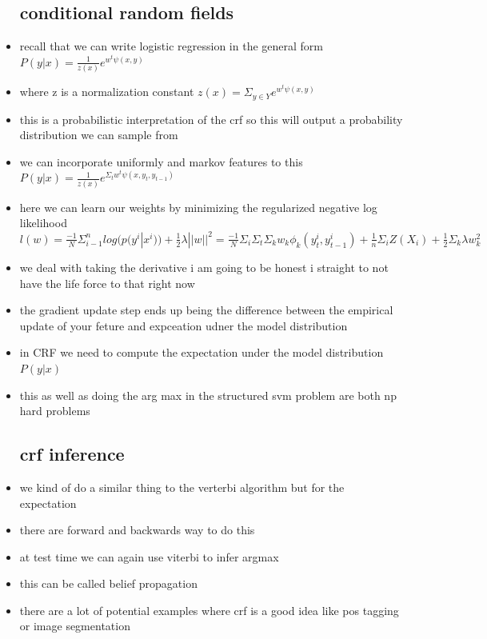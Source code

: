 \documentclass{article}
\begin{document}
\begin{itemize}
\subsection*{conditional random fields}
\item recall that we can write logistic regression in the general form $P(y|x)=\frac{1}{z(x)}e^{w^t\psi(x,y)}$
\item where z is a normalization constant $z(x)=\Sigma_{y\in Y}e^{w^t\psi(x,y)}$
\item this is a probabilistic interpretation of the crf so this will output a probability distribution we can sample from 
\item we can incorporate uniformly and markov features to this  $P(y|x)=\frac{1}{z(x)}e^{\Sigma_{t}w^t\psi(x,y_{t}, y_{t-1})}$
\item here we can learn our weights by minimizing the regularized negative log likelihood $l(w)=\frac{-1}{N}\Sigma_{i-1}^{n}log(p(y^{i}|x^{i}))+\frac{1}{2}\lambda||w||^2=\frac{-1}{N}\Sigma_{i}\Sigma_{t}\Sigma_{k}w_k\phi_{k}(y^i_t, y^i_{t-1})+\frac{1}{n}\Sigma_{i}Z(X_i)+\frac{1}{2}\Sigma_{k}\lambda w_k^2$
\item we deal with taking the derivative i am going to be honest i straight to not have the life force to that right now 
\item the gradient update step ends up being the difference between the empirical update of your feture and expceation udner the model distribution
\item in CRF we need to compute the expectation under the model distribution $P(y|x)$
\item this as well as doing the arg max in the structured svm problem are both np hard problems
\subsection*{crf inference}
\item we kind of do a similar thing to the verterbi algorithm but for the expectation 
\item there are forward and backwards way to do this 
\item at test time we can again use viterbi to infer argmax 
\item this can be called belief propagation 
\item there are a lot of potential examples where crf is a good idea like pos tagging or image segmentation
\end{itemize}
\end{document}
